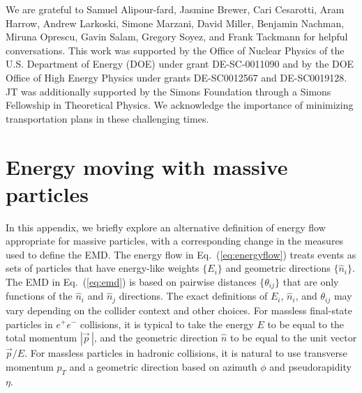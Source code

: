 \documentclass[letterpaper,11pt]{article}
\DeclareRobustCommand{\Eq}[1]{Eq.~(\ref{#1})}
\begin{document}
\acknowledgments


We are grateful to Samuel Alipour-fard, Jasmine Brewer, Cari Cesarotti, Aram Harrow, Andrew Larkoski, Simone Marzani, David Miller, Benjamin Nachman, Miruna Oprescu, Gavin Salam, Gregory Soyez, and Frank Tackmann for helpful conversations.
%
This work was supported by the Office of Nuclear Physics of the U.S. Department of Energy (DOE) under grant DE-SC-0011090 and by the DOE Office of High Energy Physics under grants DE-SC0012567 and DE-SC0019128.
%
JT was additionally supported by the Simons Foundation through a Simons Fellowship in Theoretical Physics.
%
We acknowledge the importance of minimizing transportation plans in these challenging times.


\appendix


\section{Energy moving with massive particles}
\label{sec:mass}


In this appendix, we briefly explore an alternative definition of energy flow appropriate for massive particles, with a corresponding change in the measures used to define the EMD.
%
The energy flow in \Eq{eq:energyflow} treats events as sets of particles that have energy-like weights $\{E_i\}$ and geometric directions $\{\hat{n}_i\}$.
%
The EMD in \Eq{eq:emd} is based on pairwise distances $\{\theta_{ij}\}$ that are only functions of the $\hat{n}_i$ and $\hat{n}_j$ directions.
%
The exact definitions of $E_i$, $\hat{n}_i$, and $\theta_{ij}$ may vary depending on the collider context and other choices.
%
For massless final-state particles in $e^+e^-$ collisions, it is typical to take the energy $E$ to be equal to the total momentum $|\vec p\,|$, and the geometric direction $\hat{n}$ to be equal to the unit vector $\vec{p} / E$.
%
For massless particles in hadronic collisions, it is natural to use transverse momentum $p_T$ and a geometric direction based on azimuth $\phi$ and pseudorapidity $\eta$.
\end{document}
